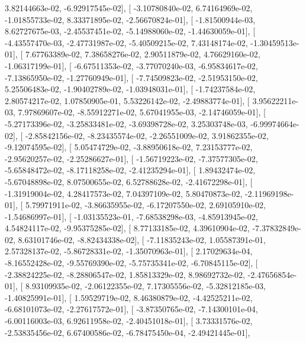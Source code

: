 \documentclass{article}
\begin{document}
          3.82144663e-02,  -6.92917545e-02],
       [ -3.10780840e-02,   6.74164969e-02,  -1.01855733e-02,
          8.33371895e-02,  -2.56670824e-01],
       [ -1.81500944e-03,   8.62727675e-03,  -2.45537451e-02,
         -5.14988060e-02,  -1.44630059e-01],
       [ -4.43557470e-03,  -2.47731987e-02,  -5.40509215e-02,
          7.43148174e-02,  -1.30459513e-01],
       [  7.67763389e-02,   7.38658276e-02,   2.90511879e-02,
          4.76629160e-02,  -1.06317199e-01],
       [ -6.67511353e-02,  -3.77070240e-03,  -6.95834617e-02,
         -7.13865950e-02,  -1.27760949e-01],
       [ -7.74509823e-02,  -2.51953150e-02,   5.25506483e-02,
         -1.90402789e-02,  -1.03948031e-01],
       [ -1.74237584e-02,   2.80574217e-02,   1.07850905e-01,
          5.53226142e-02,  -2.49883774e-01],
       [  3.95622211e-03,   7.97869607e-02,  -8.55912271e-02,
          5.67041955e-03,  -2.14746059e-01],
       [ -5.27173396e-02,  -3.25833481e-02,  -3.69398728e-02,
          3.25303748e-03,  -6.99974664e-02],
       [ -2.85842156e-02,  -8.23435574e-02,  -2.26551009e-02,
          3.91862355e-02,  -9.12074595e-02],
       [  5.05474729e-02,  -3.88950618e-02,   7.23153777e-02,
         -2.95620257e-02,  -2.25286627e-01],
       [ -1.56719223e-02,  -7.37577305e-02,  -5.65848472e-02,
         -8.17118258e-02,  -2.41235294e-01],
       [  1.89432474e-02,  -5.67048898e-02,   8.07500655e-02,
          6.52788628e-02,  -2.41672298e-01],
       [ -1.31919004e-02,   4.28417573e-02,   7.04397109e-02,
          5.80470873e-02,  -2.11969198e-01],
       [  5.79971911e-02,  -3.86635955e-02,  -6.17207550e-02,
          2.69105910e-02,  -1.54686997e-01],
       [ -1.03135523e-01,  -7.68538298e-03,  -4.85913945e-02,
          4.54824117e-02,  -9.95375285e-02],
       [  8.77133185e-02,   4.39610904e-02,  -7.37832849e-02,
          8.63101746e-02,  -8.82434338e-02],
       [ -7.11835243e-02,   1.05587391e-01,   2.57328137e-02,
         -5.86728331e-02,  -1.35070963e-01],
       [  2.17029634e-04,  -8.16552428e-02,  -9.55769390e-02,
         -5.75735341e-02,  -6.70845115e-02],
       [ -2.38824225e-02,  -8.28806547e-02,   1.85813329e-02,
          8.98692732e-02,  -2.47656854e-01],
       [  8.93109935e-02,  -2.06122355e-02,   7.17305556e-02,
         -5.32812185e-03,  -1.40825991e-01],
       [  1.59529719e-02,   8.46380879e-02,  -4.42525211e-02,
         -6.68101073e-02,  -2.27617572e-01],
       [ -3.87350765e-02,  -7.14300101e-04,  -6.00116003e-03,
          6.92611958e-02,  -2.40451018e-01],
       [  3.73331576e-02,  -2.53835456e-02,   6.67400586e-02,
         -6.78475450e-04,  -2.49421445e-01],
\end{document}
